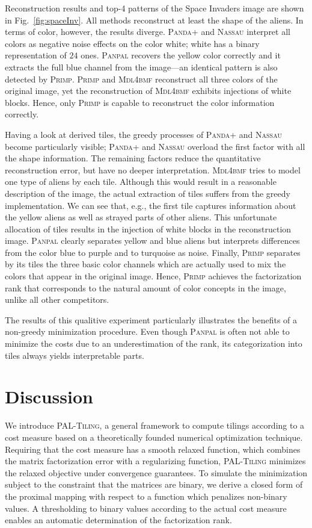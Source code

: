 Reconstruction results and top-4 patterns of the Space Invaders image are shown in Fig.~\ref{fig:spaceInv}. All methods reconstruct at least the shape of the aliens. In terms of color, however, the results diverge. \textsc{Panda+} and \textsc{Nassau} interpret all colors as negative noise effects on the color white; white has a binary representation of $24$ ones. \textsc{Panpal} recovers the yellow color correctly and it extracts the full blue channel from the image---an identical pattern is also detected by \textsc{Primp}. \textsc{Primp} and \textsc{Mdl4bmf} reconstruct all three colors of the original image, yet the reconstruction of \textsc{Mdl4bmf} exhibits injections of white blocks. Hence, only \textsc{Primp} is capable to reconstruct the color information correctly. 

Having a look at derived tiles, the greedy processes of \textsc{Panda+} and \textsc{Nassau} become particularly visible; \textsc{Panda+} and \textsc{Nassau} overload the first factor with all the shape information. The remaining factors reduce the quantitative reconstruction error, but have no deeper interpretation. \textsc{Mdl4bmf} tries to model one type of aliens by each tile. Although this would result in a reasonable description of the image, the actual extraction of tiles suffers from the greedy implementation. We can see that, e.g., the first tile captures information about the yellow aliens as well as strayed parts of other aliens. This unfortunate allocation of tiles results in the injection of white blocks in the reconstruction image.  \textsc{Panpal} clearly separates yellow and blue aliens but interprets differences from the color blue to purple and to turquoise as noise. Finally, \textsc{Primp} separates by its tiles the three basic color channels which are actually used to mix the colors that appear in the original image. Hence, \textsc{Primp} achieves the factorization rank that corresponds to the natural amount of color concepts in the image, unlike all other competitors.

The results of this qualitive experiment particularly illustrates the benefits of a non-greedy minimization procedure. Even though \textsc{Panpal} is often not able to minimize the costs due to an underestimation of the rank, its categorization into tiles always yields interpretable parts.
\section{Discussion}
We introduce \textsc{PAL-Tiling}, a general framework to compute tilings according to a cost measure based on a theoretically founded numerical optimization technique. Requiring that the cost measure has a smooth relaxed function,  which combines the matrix factorization error with a regularizing function, \textsc{PAL-Tiling} minimizes the relaxed objective under convergence guarantees. To simulate the minimization subject to the constraint that the matrices are binary, we derive a closed form of the proximal mapping with respect to a function which penalizes non-binary values. A thresholding to binary values according to the actual cost measure enables an automatic determination of the factorization rank.

